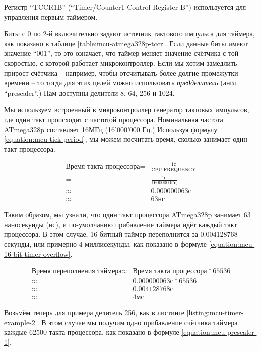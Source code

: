 \documentclass[../sparc.tex]{subfiles}
\begin{document}

Регистр ``TCCR1B'' (``Timer/Counter1 Control Register B'') используется для
управления первым таймером.


Биты с 0 по 2-й включительно задают источник тактового импульса для таймера, как
показано в таблице \ref{table:mcu-atmega328p-tccr}.  Если данные биты имеют
значение ``001'', то это означает, что таймер меняет значение счётчика с той
скоростью, с которой работает микроконтроллер.  Если мы хотим замедлить прирост
счётчика -- например, чтобы отсчитывать более долгие промежутки времени -- то
тогда для этих целей можно использовать \emph{предделитель}
(англ. ``prescaler''.)  Нам доступны делители 8, 64, 256 и 1024.

Мы используем встроенный в микроконтроллер генератор тактовых импульсов, где
один такт происходит с частотой процессора.  Номинальная частота ATmega328p
составляет 16МГц (16'000'000 Гц.)  Используя формулу
\ref{equation:mcu-tick-period}, мы можем посчитать время, сколько занимает один
такт процессора.

\begin{align}
  \mbox{Время такта процессора} =& \frac{1\mbox{с}}{\mbox{CPU\_FREQUENCY}} \nonumber \\
  =& \frac{1\mbox{с}}{16000000 \mbox{Гц}} \nonumber \\
  \approx& 0.000000063\mbox{с} \\
  \approx& 63\mbox{нс}
  \label{equation:mcu-tick-period}
\end{align}

Таким образом, мы узнали, что один такт процессора ATmega328p занимает 63
наносекунды (нс), и по-умолчанию прибавление таймера идёт каждый такт
процессора.  В этом случае, 16-битный таймер переполнится за 0.004128768
секунды, или примерно 4 миллисекунды, как показано в формуле
\ref{equation:mcu-16-bit-timer-overflow}.

\begin{align}
  \mbox{Время переполнения таймера} \approx& \mbox{Время такта процессора} * 65536 \nonumber \\
  \approx& 0.000000063\mbox{с} * 65536 \nonumber \\
  \approx& 0.004128768\mbox{с} \\
  \approx& 4\mbox{мс}
  \label{equation:mcu-16-bit-timer-overflow}
\end{align}

Возьмём теперь для примера делитель 256, как в листинге
\ref{listing:mcu-timer-example-2}.  В этом случае мы получим одно прибавление
счётчика таймера каждые 62500 такта процессора, как показано в формуле
\ref{equation:mcu-prescaler-1}.
\end{document}
